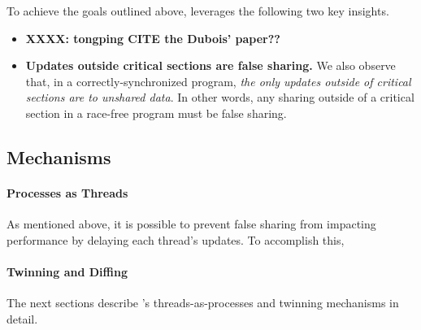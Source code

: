 To achieve the goals outlined above, \sheriff{} leverages the following
two key insights.

\begin{itemize}

\item \textbf{XXXX: tongping CITE the Dubois' paper??} 

\item {\bf Updates outside critical sections are false sharing.}
We also observe that, in a correctly-synchronized program, \emph{the
only updates outside of critical sections are to unshared data}. In
other words, any sharing outside of a critical section in a race-free
program must be false sharing.

\end{itemize}


\subsection{Mechanisms}

\paragraph{Processes as Threads}
As mentioned above, it is possible to prevent false sharing from
impacting performance by delaying each thread's updates. To accomplish
this, 

\paragraph{Twinning and Diffing}
\label{overview-twinpage}


The next sections describe \sheriff{}'s threads-as-processes and twinning
mechanisms in detail.






